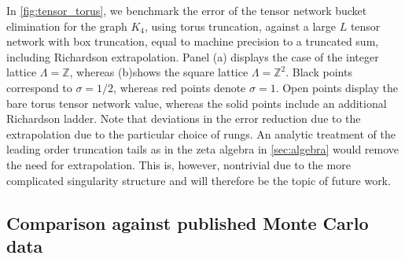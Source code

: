 \documentclass[]{amsart}
\numberwithin{mythm}{section}
\begin{document}
In \cref{fig:tensor_torus}, we benchmark the error of the tensor network bucket elimination for the graph $K_4$, using torus truncation, against a large $L$ tensor network with box truncation, equal to machine precision to a truncated sum, including Richardson extrapolation. Panel (a) displays the case of the integer lattice $\Lambda=\mathds Z$, whereas (b)shows the square lattice $\Lambda=\mathds Z^2$. Black points correspond to $\sigma=1/2$, whereas red points denote $\sigma=1$. Open points display the bare torus tensor network value, whereas the solid points include an additional Richardson ladder. Note that deviations in the error reduction due to the extrapolation due to the particular choice of rungs. An analytic treatment of the leading order truncation tails as in the zeta algebra in \cref{sec:algebra} would remove the need for extrapolation. This is, however, nontrivial due to the more complicated singularity structure and will therefore be the topic of future work.


\subsection{Comparison against published Monte Carlo data}
\end{document}
